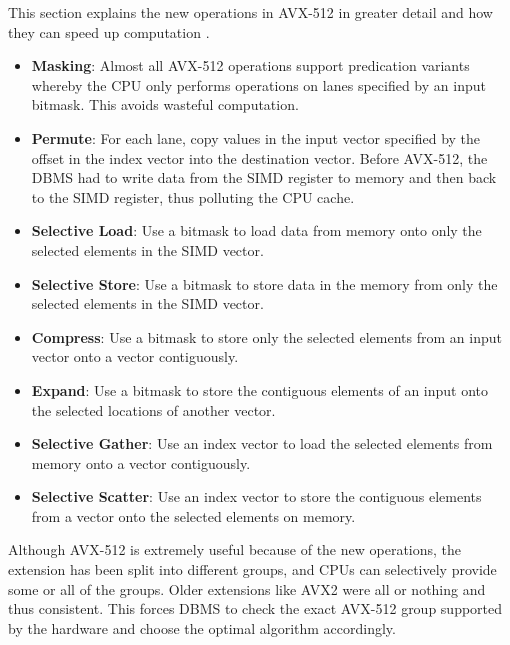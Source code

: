 \documentclass[11pt]{article}
\begin{document}
This section explains the new operations in AVX-512 in greater detail and how they can speed up computation \cite{10.1145/3211922.3211928}.

\begin{itemize}

        \item 
        \textbf{Masking}: Almost all AVX-512 operations support predication variants whereby the CPU only performs operations on lanes specified by an input bitmask. This avoids wasteful computation.
        
        \item 
        \textbf{Permute}: For each lane, copy values in the input vector specified by the offset in the index vector into the destination vector. Before AVX-512, the DBMS had to write data from the SIMD register to memory and then back to the SIMD register, thus polluting the CPU cache.

        \item 
        \textbf{Selective Load}: Use a bitmask to load data from memory onto only the selected elements in the SIMD vector. 

        \item 
        \textbf{Selective Store}: Use a bitmask to store data in the memory from only the selected elements in the SIMD vector. 

        \item 
        \textbf{Compress}: Use a bitmask to store only the selected elements from an input vector onto a vector contiguously.

        \item 
        \textbf{Expand}: Use a bitmask to store the contiguous elements of an input onto the selected locations of another vector.

        \item 
        \textbf{Selective Gather}: Use an index vector to load the selected elements from memory onto a vector contiguously.

        \item 
        \textbf{Selective Scatter}: Use an index vector to store the contiguous elements from a vector onto the selected elements on memory.
\end{itemize}

Although AVX-512 is extremely useful because of the new operations, the extension has been split into different groups, and CPUs can selectively provide some or all of the groups. Older extensions like AVX2 were all or nothing and thus consistent. This forces DBMS to check the exact AVX-512 group supported by the hardware and choose the optimal algorithm accordingly. 
\end{document}
